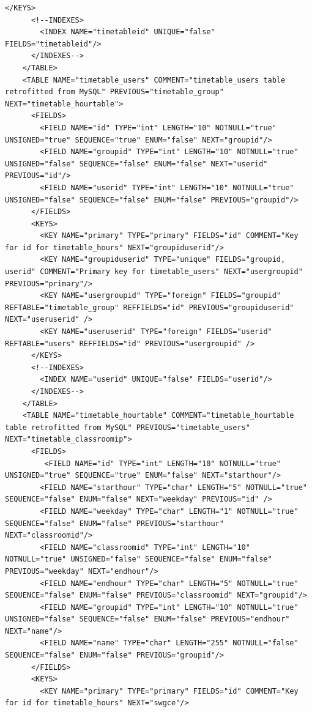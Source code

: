 \documentclass[a4paper]{report}  %
\begin{document}
\begin{lstlisting}[style=XML, caption=Fitxer xmldb install.xml per la creació de les taules]
      </KEYS> 
      <!--INDEXES> 
        <INDEX NAME="timetableid" UNIQUE="false" FIELDS="timetableid"/> 
      </INDEXES--> 
    </TABLE> 
    <TABLE NAME="timetable_users" COMMENT="timetable_users table retrofitted from MySQL" PREVIOUS="timetable_group" NEXT="timetable_hourtable"> 
      <FIELDS> 
	    <FIELD NAME="id" TYPE="int" LENGTH="10" NOTNULL="true" UNSIGNED="true" SEQUENCE="true" ENUM="false" NEXT="groupid"/>  
        <FIELD NAME="groupid" TYPE="int" LENGTH="10" NOTNULL="true" UNSIGNED="false" SEQUENCE="false" ENUM="false" NEXT="userid" PREVIOUS="id"/> 
        <FIELD NAME="userid" TYPE="int" LENGTH="10" NOTNULL="true" UNSIGNED="false" SEQUENCE="false" ENUM="false" PREVIOUS="groupid"/> 
      </FIELDS> 
      <KEYS> 
		<KEY NAME="primary" TYPE="primary" FIELDS="id" COMMENT="Key for id for timetable_hours" NEXT="groupiduserid"/>    
        <KEY NAME="groupiduserid" TYPE="unique" FIELDS="groupid, userid" COMMENT="Primary key for timetable_users" NEXT="usergroupid" PREVIOUS="primary"/> 
		<KEY NAME="usergroupid" TYPE="foreign" FIELDS="groupid" REFTABLE="timetable_group" REFFIELDS="id" PREVIOUS="groupiduserid" NEXT="useruserid" /> 
		<KEY NAME="useruserid" TYPE="foreign" FIELDS="userid" REFTABLE="users" REFFIELDS="id" PREVIOUS="usergroupid" /> 
      </KEYS> 
      <!--INDEXES> 
        <INDEX NAME="userid" UNIQUE="false" FIELDS="userid"/> 
      </INDEXES--> 
    </TABLE> 
    <TABLE NAME="timetable_hourtable" COMMENT="timetable_hourtable table retrofitted from MySQL" PREVIOUS="timetable_users" NEXT="timetable_classroomip"> 
      <FIELDS> 
         <FIELD NAME="id" TYPE="int" LENGTH="10" NOTNULL="true" UNSIGNED="true" SEQUENCE="true" ENUM="false" NEXT="starthour"/> 
		<FIELD NAME="starthour" TYPE="char" LENGTH="5" NOTNULL="true" SEQUENCE="false" ENUM="false" NEXT="weekday" PREVIOUS="id" /> 
        <FIELD NAME="weekday" TYPE="char" LENGTH="1" NOTNULL="true" SEQUENCE="false" ENUM="false" PREVIOUS="starthour" NEXT="classroomid"/> 
        <FIELD NAME="classroomid" TYPE="int" LENGTH="10" NOTNULL="true" UNSIGNED="false" SEQUENCE="false" ENUM="false" PREVIOUS="weekday" NEXT="endhour"/> 
        <FIELD NAME="endhour" TYPE="char" LENGTH="5" NOTNULL="true" SEQUENCE="false" ENUM="false" PREVIOUS="classroomid" NEXT="groupid"/> 
        <FIELD NAME="groupid" TYPE="int" LENGTH="10" NOTNULL="true" UNSIGNED="false" SEQUENCE="false" ENUM="false" PREVIOUS="endhour" NEXT="name"/> 
        <FIELD NAME="name" TYPE="char" LENGTH="255" NOTNULL="false" SEQUENCE="false" ENUM="false" PREVIOUS="groupid"/> 
      </FIELDS> 
      <KEYS> 
		<KEY NAME="primary" TYPE="primary" FIELDS="id" COMMENT="Key for id for timetable_hours" NEXT="swgce"/>    

\end{lstlisting}
\end{document}
